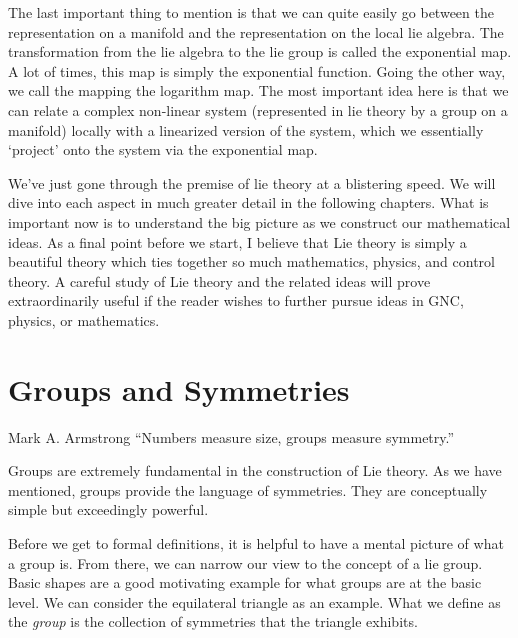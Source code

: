 The last important thing to mention is that we can quite easily go between the representation on a manifold and the representation on the local \gls{lie algebra}. The transformation from the \gls{lie algebra} to the \gls{lie group} is called the \gls{exponential map}. A lot of times, this map is simply the exponential function. Going the other way, we call the mapping the logarithm map. The most important idea here is that we can relate a complex non-linear system (represented in \gls{lie theory} by a group on a manifold) locally with a linearized version of the system, which we essentially `project' onto the system via the \gls{exponential map}. 

We've just gone through the premise of \gls{lie theory} at a blistering speed. We will dive into each aspect in much greater detail in the following chapters. What is important now is to understand the big picture as we construct our mathematical ideas. As a final point before we start, I believe that Lie theory is simply a beautiful theory which ties together so much mathematics, physics, and control theory. A careful study of Lie theory and the related ideas will prove extraordinarily useful if the reader wishes to further pursue ideas in GNC, physics, or mathematics.

\newpage
\section{Groups and Symmetries}\label{sec:groups and syms}
\begin{chapquote}{Mark A. Armstrong}
    ``Numbers measure size, groups measure symmetry.''
\end{chapquote}

Groups are extremely fundamental in the construction of Lie theory. As we have mentioned, groups provide the language of symmetries. They are conceptually simple but exceedingly powerful.

Before we get to formal definitions, it is helpful to have a mental picture of what a group is. From there, we can narrow our view to the concept of a  \gls{lie group}. Basic shapes are a good motivating example for what groups are at the basic level. We can consider the equilateral triangle as an example. What we define as the \textit{group} is the collection of symmetries that the triangle exhibits.

